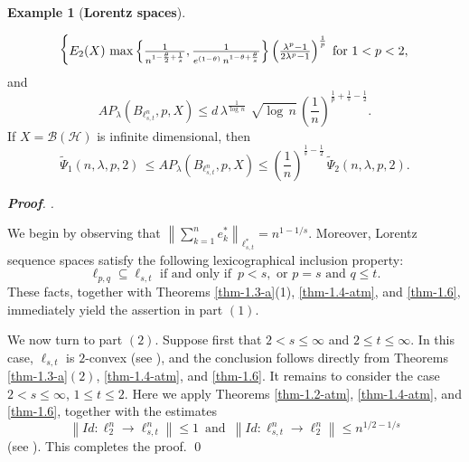 \documentclass[a4paper,11pt, reqno]{amsart}
\theoremstyle{definition}
\newtheorem{example}{Example}[section]
\newenvironment{pf}[1][]{%
	\vskip 3mm
	\noindent
	\ifthenelse{\equal{#1}{}}%
	{{\slshape {\bf Proof}. }}%
	{{\slshape #1.} }%
}%
{\qed\bigskip}
\newcommand{\norm}[1]{\left\lVert#1\right\rVert}
\begin{document}
\begin{example}[{\bf Lorentz spaces}]
\begin{enumerate}
\begin{equation*}
\begin{cases}
				E_{2}(X)\,  \max \left\{\frac{1}{n^{1-\frac{\theta}{2}+\frac{1}{s}}},  \frac{1}{e^{(1-\theta)}\,n^{1-\theta+\frac{\theta}{s}}}\right\}\left(\frac{\lambda^p -1}{2\lambda^p - 1}\right)^{\frac{1}{p}} \hspace{-2mm} & \text{for $1<p< 2$}, 
			\end{cases}
			\end{equation*}
			and $$AP_{\lambda}(B_{\ell^n_{s,t}}, p,X) \leq d\,  \lambda^{\frac{1}{\log\,n}}\,\, \sqrt{\log \, n} \, \left(\frac{1}{n}\right)^{\frac{1}{p}+\frac{1}{s}-\frac{1}{2}}.
			$$ If $X=\mathcal{B}(\mathcal{H})$ is infinite dimensional, then $$\tilde{\Psi}_{1}(n,\lambda,p,2) \, \leq AP_{\lambda}(B_{\ell^n_{s,t}}, p,X)  \leq \left(\frac{1}{n}\right)^{\frac{1}{s}-\frac{1}{2}} \, \tilde{\Psi}_{2}(n,\lambda,p,2).
			$$
		\end{enumerate}
	\end{example}
	\begin{pf}
		We begin by observing that $\norm{\sum_{k=1}^{n}e^{*}_{k}}_{\ell_{s,t}^{*}}=n^{1-1/s}$. Moreover, Lorentz sequence spaces satisfy the following lexicographical inclusion property: $$\ell_{p,q} \subseteq \ell_{s,t}\,\, \mbox{if and only if}\,\,\, p<s, \,\, \mbox{or}\,\, p=s\,\, \mbox{and}\,\, q \leq t.
		$$
		 These facts, together with Theorems \ref{thm-1.3-a}(1), \ref{thm-1.4-atm}, and \ref{thm-1.6}, immediately yield the assertion in part $(1)$. 
		 \vspace{1mm}
		 
		 We now turn to part $(2)$. Suppose first that $2<s \leq \infty$ and $2 \leq t \leq \infty$. In this case, $\ell_{s,t}$ is $2$-convex (see \cite[p.189]{defant-2003}), and the conclusion follows directly from Theorems \ref{thm-1.3-a}$(2)$, \ref{thm-1.4-atm}, and \ref{thm-1.6}. It remains to consider the case $2 < s \leq \infty$, $1 \leq t \leq 2$. Here we apply Theorems \ref{thm-1.2-atm}, \ref{thm-1.4-atm}, and \ref{thm-1.6}, together with the estimates 
		 $$
		 \norm{Id: \ell^n_{2} \rightarrow \ell^n_{s,t}} \leq 1\,\,\,\mbox{and}\,\,\, \norm{Id: \ell^n_{s,t} \rightarrow \ell^n_{2}} \leq n^{1/2 - 1/s}
		 $$ 
		 (see \cite[p.189]{defant-2003}). This completes the proof.
	\end{pf}
\end{document}
